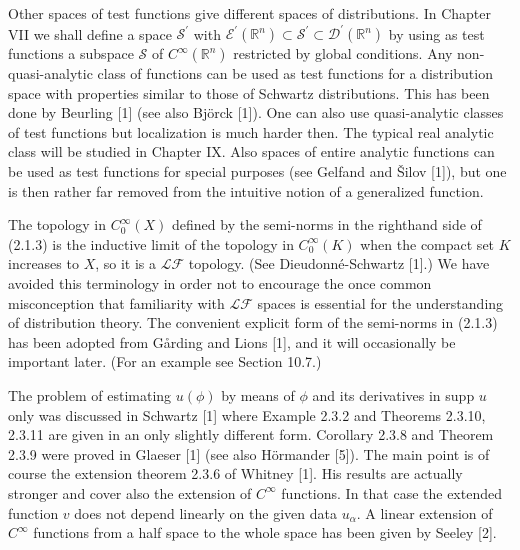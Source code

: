 Other spaces of test functions give different spaces of distributions. In Chapter VII we shall define a space $\mathscr{S}^{\prime}$ with $\mathscr{E}^{\prime}\left(\mathbb{R}^{n}\right) \subset \mathscr{S}^{\prime} \subset \mathscr{D}^{\prime}\left(\mathbb{R}^{n}\right)$ by using as test functions a subspace $\mathscr{S}$ of $C^{\infty}\left(\mathbb{R}^{n}\right)$ restricted by global conditions. Any non-quasi-analytic class of functions can be used as test functions for a distribution space with properties similar to those of Schwartz distributions. This has been done by Beurling [1] (see also Björck [1]). One can also use quasi-analytic classes of test functions but localization is much harder then. The typical real analytic class will be studied in Chapter IX. Also spaces of entire analytic functions can be used as test functions for special purposes (see Gelfand and Šilov [1]), but one is then rather far removed from the intuitive notion of a generalized function.

The topology in $C_{0}^{\infty}(X)$ defined by the semi-norms in the righthand side of (2.1.3) is the inductive limit of the topology in $C_{0}^{\infty}(K)$ when the compact set $K$ increases to $X$, so it is a $\mathscr{L} \mathscr{F}$ topology. (See Dieudonné-Schwartz [1].) We have avoided this terminology in order not to encourage the once common misconception that familiarity with $\mathscr{L} \mathscr{F}$ spaces is essential for the understanding of distribution theory. The convenient explicit form of the semi-norms in (2.1.3) has been adopted from Gårding and Lions [1], and it will occasionally be important later. (For an example see Section 10.7.)

The problem of estimating $u(\phi)$ by means of $\phi$ and its derivatives in supp $u$ only was discussed in Schwartz [1] where Example 2.3.2 and Theorems 2.3.10, 2.3.11 are given in an only slightly different form. Corollary 2.3.8 and Theorem 2.3.9 were proved in Glaeser [1] (see also Hörmander [5]). The main point is of course the extension theorem 2.3.6 of Whitney [1]. His results are actually stronger and cover also the extension of $C^{\infty}$ functions. In that case the extended function $v$ does not depend linearly on the given data $u_{\alpha}$. A linear extension of $C^{\infty}$ functions from a half space to the whole space has been given by Seeley [2].
